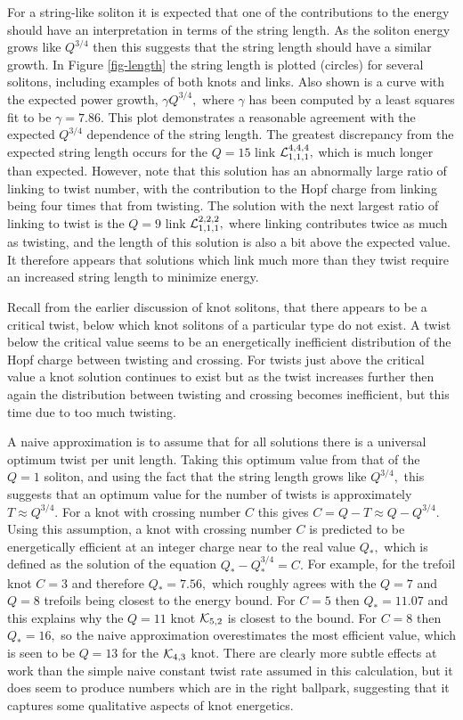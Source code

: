 \documentclass[12pt]{article}
\begin{document}
For a string-like soliton it is expected that one of the 
contributions to the energy should have an interpretation in terms
of the string length. As the soliton energy grows like $Q^{3/4}$
then this suggests that the string length should have a similar growth.
 In Figure \ref{fig-length} the string length is plotted (circles)
for several solitons, including examples of both knots and links.
 Also shown is a curve with the 
expected power growth, $\gamma Q^{3/4},$ where $\gamma$ has been
computed by a least squares fit to be $\gamma=7.86.$ 
This plot demonstrates a reasonable agreement with the expected
$Q^{3/4}$ dependence of the string length. The greatest discrepancy
from the expected string length occurs for the $Q=15$ link 
${\cal L}_{1,1,1}^{4,4,4},$ which is much longer than expected. 
However, note that this solution has an abnormally large ratio of linking
to twist number, with the contribution to the Hopf charge from linking being
four times that from twisting. The solution with the next largest ratio of
linking to twist is the $Q=9$ link ${\cal L}_{1,1,1}^{2,2,2},$ where linking
contributes twice as much as twisting, and the length of this solution
is also a bit above the expected value. It therefore appears that
solutions which link much more than they twist require an increased string
length to minimize energy.   

Recall from the earlier discussion of knot solitons,
that there appears to be a critical twist,
below which knot solitons of a particular type do not exist.
A twist below the critical value seems to be an energetically
inefficient distribution of the Hopf charge between twisting and crossing.
For twists just above the critical value a knot solution continues
to exist but as the twist increases further then again the 
distribution between twisting and crossing becomes inefficient, but this
time due to too much twisting. 

A naive approximation is to assume that for all solutions there is a 
universal optimum twist per unit length. Taking this optimum value from
that of the $Q=1$ soliton, and using the fact that the string length
grows like $Q^{3/4},$ this suggests that an optimum value for the number
of twists is approximately $T\approx Q^{3/4}.$ For a knot with crossing number
 $C$ this gives $C=Q-T\approx Q-Q^{3/4}.$ Using this assumption, a knot
with crossing number $C$ is predicted to be energetically efficient
at an integer charge near to the real value $Q_*,$ which is defined 
as the solution of the equation $Q_*-Q_*^{3/4}=C.$ 
For example, for the trefoil knot
$C=3$ and therefore $Q_*=7.56,$ which roughly agrees with the $Q=7$ and
$Q=8$ trefoils being closest to the energy bound. For $C=5$ then $Q_*=11.07$
and this explains why the $Q=11$ knot ${\cal K}_{5,2}$ is closest to
the bound. For $C=8$ then $Q_*=16,$ so the naive approximation
overestimates the most efficient value, which is seen to be $Q=13$
for the ${\cal K}_{4,3}$ knot.
There are clearly more subtle effects at work than the simple naive
constant twist rate assumed in this calculation, but it does seem to
produce numbers which are in the right ballpark, suggesting that it captures
some qualitative aspects of knot energetics.   
\end{document}
